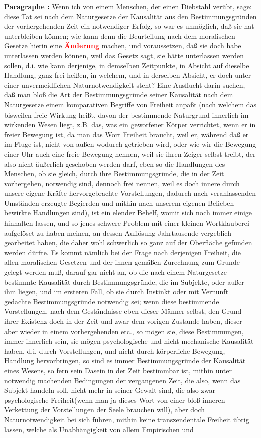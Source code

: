 \documentclass[a4paper,12pt,twoside]{book}
\newcommand{\match}[1]{\textcolor{red}{\textbf{#1}}}
\begin{document}
	\noindent\textbf{Paragraphe : }Wenn ich von einem Menschen, der einen Diebstahl verübt, sage: diese Tat sei nach dem Naturgesetze der Kausalität aus den Bestimmungsgründen der vorhergehenden Zeit ein notwendiger Erfolg, so war es unmöglich, daß sie hat unterbleiben können; wie kann denn die Beurteilung nach dem moralischen Gesetze hierin eine \match{Änderung} machen, und voraussetzen, daß sie doch habe unterlassen werden können, weil das Gesetz sagt, sie hätte unterlassen werden sollen, d.i. wie kann derjenige, in demselben Zeitpunkte, in Absicht auf dieselbe Handlung, ganz frei heißen, in welchem, und in  derselben Absicht, er doch unter einer unvermeidlichen Naturnotwendigkeit steht? Eine Ausflucht darin suchen, daß man bloß die Art der Bestimmungsgründe seiner Kausalität nach dem Naturgesetze einem komparativen Begriffe von Freiheit anpaßt (nach welchem das bisweilen freie Wirkung heißt, davon der bestimmende Naturgrund innerlich im wirkenden Wesen liegt, z.B. das, was ein geworfener Körper verrichtet, wenn er in freier Bewegung ist, da man das Wort Freiheit braucht, weil er, während daß er im Fluge ist, nicht von außen wodurch getrieben wird, oder wie wir die Bewegung einer Uhr auch eine freie Bewegung nennen, weil sie ihren Zeiger selbst treibt, der also nicht äußerlich geschoben werden darf, eben so die Handlungen des Menschen, ob sie gleich, durch ihre Bestimmungsgründe, die in der Zeit vorhergehen, notwendig sind, dennoch frei nennen, weil es doch innere durch unsere eigene Kräfte hervorgebrachte Vorstellungen, dadurch nach veranlassenden Umständen erzeugte Begierden und mithin nach unserem eigenen Belieben bewirkte Handlungen sind), ist ein elender Behelf, womit sich noch immer einige hinhalten lassen, und so jenes schwere Problem mit einer kleinen Wortklauberei aufgelöset zu haben meinen, an dessen Auflösung Jahrtausende vergeblich gearbeitet haben, die daher wohl schwerlich so ganz auf der Oberfläche gefunden werden dürfte. Es kommt nämlich bei der Frage nach derjenigen Freiheit, die allen moralischen Gesetzen und der ihnen gemäßen Zurechnung zum Grunde gelegt werden muß, darauf gar nicht an, ob die nach einem Naturgesetze bestimmte Kausalität durch Bestimmungsgründe, die im Subjekte, oder außer ihm liegen, und im ersteren Fall, ob sie durch Instinkt oder mit Vernunft gedachte Bestimmungsgründe notwendig sei; wenn diese bestimmende Vorstellungen, nach dem Geständnisse eben dieser Männer selbst, den Grund ihrer Existenz doch in der Zeit und zwar dem vorigen Zustande haben, dieser aber wieder in einem vorhergehenden etc., so mögen sie, diese Bestimmungen, immer innerlich sein, sie mögen psychologische und nicht mechanische Kausalität haben, d.i. durch Vorstellungen, und nicht durch körperliche Bewegung,  Handlung hervorbringen, so sind es immer Bestimmungsgründe der Kausalität eines Wesens, so fern sein Dasein in der Zeit bestimmbar ist, mithin unter notwendig machenden Bedingungen der vergangenen Zeit, die also, wenn das Subjekt handeln soll, nicht mehr in seiner Gewalt sind, die also zwar psychologische Freiheit(wenn man ja dieses Wort von einer bloß inneren Verkettung der Vorstellungen der Seele brauchen will), aber doch Naturnotwendigkeit bei sich führen, mithin keine transzendentale Freiheit übrig lassen, welche als Unabhängigkeit von allem Empirischen und 
\end{document}
